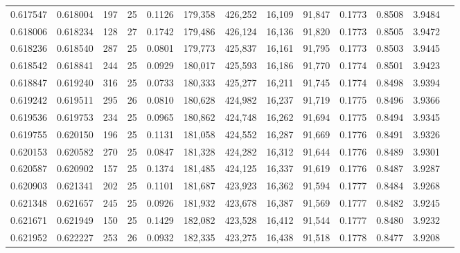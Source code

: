 \begin{tabular}{rrrrrrrrrrrrr}
0.617547 & 0.618004 &   197 &  25 &                                     0.1126 & 179,358 & 426,252 &  16,109 &  91,847 & 0.1773 & 0.8508 & 3.9484 \\
0.618006 & 0.618234 &   128 &  27 &                                     0.1742 & 179,486 & 426,124 &  16,136 &  91,820 & 0.1773 & 0.8505 & 3.9472 \\
0.618236 & 0.618540 &   287 &  25 &                                     0.0801 & 179,773 & 425,837 &  16,161 &  91,795 & 0.1773 & 0.8503 & 3.9445 \\
0.618542 & 0.618841 &   244 &  25 &                                     0.0929 & 180,017 & 425,593 &  16,186 &  91,770 & 0.1774 & 0.8501 & 3.9423 \\
0.618847 & 0.619240 &   316 &  25 &                                     0.0733 & 180,333 & 425,277 &  16,211 &  91,745 & 0.1774 & 0.8498 & 3.9394 \\
0.619242 & 0.619511 &   295 &  26 &                                     0.0810 & 180,628 & 424,982 &  16,237 &  91,719 & 0.1775 & 0.8496 & 3.9366 \\
0.619536 & 0.619753 &   234 &  25 &                                     0.0965 & 180,862 & 424,748 &  16,262 &  91,694 & 0.1775 & 0.8494 & 3.9345 \\
0.619755 & 0.620150 &   196 &  25 &                                     0.1131 & 181,058 & 424,552 &  16,287 &  91,669 & 0.1776 & 0.8491 & 3.9326 \\
0.620153 & 0.620582 &   270 &  25 &                                     0.0847 & 181,328 & 424,282 &  16,312 &  91,644 & 0.1776 & 0.8489 & 3.9301 \\
0.620587 & 0.620902 &   157 &  25 &                                     0.1374 & 181,485 & 424,125 &  16,337 &  91,619 & 0.1776 & 0.8487 & 3.9287 \\
0.620903 & 0.621341 &   202 &  25 &                                     0.1101 & 181,687 & 423,923 &  16,362 &  91,594 & 0.1777 & 0.8484 & 3.9268 \\
0.621348 & 0.621657 &   245 &  25 &                                     0.0926 & 181,932 & 423,678 &  16,387 &  91,569 & 0.1777 & 0.8482 & 3.9245 \\
0.621671 & 0.621949 &   150 &  25 &                                     0.1429 & 182,082 & 423,528 &  16,412 &  91,544 & 0.1777 & 0.8480 & 3.9232 \\
0.621952 & 0.622227 &   253 &  26 &                                     0.0932 & 182,335 & 423,275 &  16,438 &  91,518 & 0.1778 & 0.8477 & 3.9208 \\

\end{tabular}

